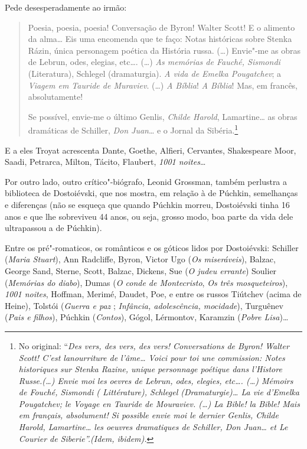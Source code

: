 Pede desesperadamente ao irmão:

\begin{quote}
Poesia, poesia, poesia! Conversação de Byron! Walter Scott! E o
alimento da alma\ldots{} Eis uma encomenda que te faço: Notas históricas
sobre Stenka Rázin, única personagem poética da História russa. (\ldots{})
Envie"-me as obras de Lebrun, odes, elegias, etc\ldots{}. (\ldots{}) \emph{As
memórias de Fauché, Sismondi} (Literatura), Schlegel (dramaturgia).
\emph{A vida de Emelka Pougatchev}; a \emph{Viagem em Tauride de
Muraviev}. (\ldots{}) \emph{A Bíblia}! \emph{A Bíblia}! Mas, em francês,
absolutamente!

Se possível, envie-me o último Genlis, \emph{Childe Harold},
Lamartine\ldots{} as obras dramáticas de Schiller, \emph{Don Juan}\ldots{} e o
Jornal da Sibéria.\footnote{No original: ``\emph{Des vers, des vers,
  des vers! Conversations de Byron! Walter Scott! C'est lanourriture de
  l'âme\ldots{} Voici pour toi une commission: Notes historiques sur
  Stenka Razine, unique personnage poétique dans l'Histore
  Russe.(\ldots{}) Envie moi les oevres de Lebrun, odes, elegies,
  etc\ldots{}. (\ldots{}) \emph{Mémoirs de Fouché, Sismondi} (
  Littérature), Schlegel (Dramaturgie)\ldots{} \emph{La vie d'Emelka Pougatchev}; le
  \emph{Voyage en Tauride de Mouraviev}. (\ldots{}) La \emph{Bible}! la \emph{Bible}! Mais em
  français, absolument! Si possible envie moi le dernier Genlis, \emph{Childe Harold},
  Lamartine\ldots{} les oeuvres dramatiques de Schiller, \emph{Don Juan}\ldots{} et Le
  Courier de Siberie''.(Idem, ibidem).}}
\end{quote}

E a eles Troyat acrescenta Dante, Goethe, Alfieri, Cervantes,
Shakespeare Moor, Saadi, Petrarca, Milton, Tácito, Flaubert, \emph{1001
noites}\ldots{}

Por outro lado, outro crítico"-biógrafo, Leonid Grossman, também
perlustra a biblioteca de Dostoiévski, que nos mostra, em relação à de
Púchkin, semelhanças e diferenças (não se esqueça que quando Púchkin
morreu, Dostoiévski tinha 16 anos e que lhe sobreviveu 44 anos, ou
seja, grosso modo, boa parte da vida dele ultrapassou a de Púchkin).

Entre os pré"-romaticos, os românticos e os góticos lidos por
Dostoiévski: Schiller (\emph{Maria Stuart}), Ann Radcliffe, Byron,
Victor Ugo (\emph{Os miseráveis}), Balzac, George Sand, Sterne, Scott,
Balzac, Dickens, Sue (\emph{O judeu errante}) Soulier (\emph{Memórias
do diabo}), Dumas (\emph{O conde de Montecristo}, \emph{Os três
mosqueteiros}), \emph{1001 noites}, Hoffman, Merimé, Daudet, Poe, e
entre os russos Tiútchev (acima de Heine), Tolstói (\emph{Guerra e paz}
; \emph{Infância, adolescência, mocidade}), Turguênev (\emph{Pais e
filhos}), Púchkin (\emph{Contos}), Gógol, Lérmontov, Karamzin
(\emph{Pobre Lisa})\ldots{}

